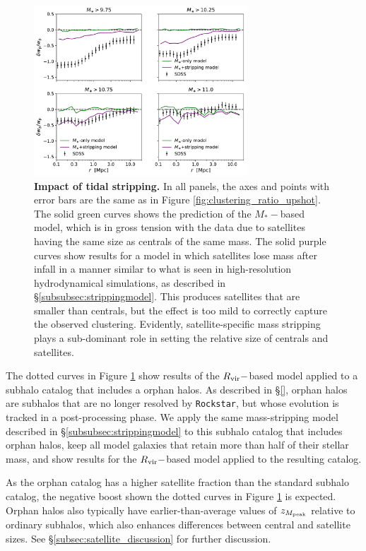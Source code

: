 \documentclass[usenatbib,usegraphicx,letterpaper]{mn2e}
\newcommand{\mstar}{M_{\ast}}
\newcommand{\zpeak}{z_{M_{\rm peak}}}
\newcommand{\rvir}{R_{\rm vir}}
\begin{document}
\begin{figure}
\centering
\includegraphics[width=8cm]{FIGS/alt_model_wp_ratios.pdf}
\caption{
{\bf Impact of tidal stripping.}
In all panels, the axes and points with error bars are the same as in Figure \ref{fig:clustering_ratio_upshot}. The solid green curves shows the prediction of the $\mstar-$based model, which is in gross tension with the data due to satellites having the same size as centrals of the same mass. The solid purple curves show results for a model in which satellites lose mass after infall in a manner similar to what is seen in high-resolution hydrodynamical simulations, as described in \S\ref{subsubsec:strippingmodel}. This produces satellites that are smaller than centrals, but the effect is too mild to correctly capture the observed clustering. Evidently, satellite-specific mass stripping plays a sub-dominant role in setting the relative size of centrals and satellites.
}
\label{fig:strippingorphans}
\end{figure}

The dotted curves in Figure \ref{fig:strippingorphans} show results of the $\rvir-$based model applied to a subhalo catalog that includes a orphan halos. As described in \S\ref{}, orphan halos are subhalos that are no longer resolved by {\tt Rockstar}, but whose evolution is tracked in a post-processing phase. We apply the same mass-stripping model described in \S\ref{subsubsec:strippingmodel} to this subhalo catalog that includes orphan halos, keep all model galaxies that retain more than half of their stellar mass, and show results for the $\rvir-$based model applied to the resulting catalog.

As the orphan catalog has a higher satellite fraction than the standard subhalo catalog, the negative boost shown the dotted curves in Figure \ref{fig:strippingorphans} is expected. Orphan halos also typically have earlier-than-average values of $\zpeak$ relative to ordinary subhalos, which also enhances differences between central and satellite sizes. See \S\ref{subsec:satellite_discussion} for further discussion.
\end{document}
